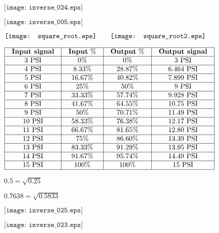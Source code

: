 \documentclass[12pt,a4paper,margin=2cm]{book}
\def\lthtmlcheckvsize{\ifdim\ht\sizebox<\vsize 
  \ifdim\wd\sizebox<\hsize\expandafter\hfill\fi \expandafter\vfill
  \else\expandafter\vss\fi}%
\begin{document}
{\newpage\clearpage
{}%
$\displaystyle \texttt{[image: inverse\_024.eps]}$%
\lthtmlindisplaymathZ
\lthtmlcheckvsize\clearpage}

{\newpage\clearpage
{}%
$\displaystyle \texttt{[image: inverse\_005.eps]}$%
\lthtmlindisplaymathZ
\lthtmlcheckvsize\clearpage}

{\newpage\clearpage
{}%
$\displaystyle \texttt{[image: square\_root.eps]} \hskip 20pt \texttt{[image: square\_root2.eps]}$%
\lthtmlindisplaymathZ
\lthtmlcheckvsize\clearpage}

{\newpage\clearpage
{}%
$\displaystyle \vbox{\offinterlineskip
\halign{\strut
\vrule \quad\hfil # \  \hfil & 
\vrule \quad\hfil # \  \hfil & 
\vrule \quad\hfil # \  \hfil & 
\vrule \quad\hfil # \  \hfil \vrule \cr
\noalign{\hrule }
\textbf{Input signal} & \textbf{Input} \% & \textbf{Output} \% & \textbf{Output signal} \cr
\noalign{\hrule }
3 PSI & 0\% & 0\% & 3 PSI \cr
\noalign{\hrule }
4 PSI & 8.33\% & 28.87\% & 6.464 PSI \cr
\noalign{\hrule }
5 PSI & 16.67\% & 40.82\% & 7.899 PSI \cr
\noalign{\hrule }
6 PSI & 25\% & 50\% & 9 PSI \cr
\noalign{\hrule }
7 PSI & 33.33\% & 57.74\% & 9.928 PSI \cr
\noalign{\hrule }
8 PSI & 41.67\% & 64.55\% & 10.75 PSI \cr
\noalign{\hrule }
9 PSI & 50\% & 70.71\% & 11.49 PSI \cr
\noalign{\hrule }
10 PSI & 58.33\% & 76.38\% & 12.17 PSI \cr
\noalign{\hrule }
11 PSI & 66.67\% & 81.65\% & 12.80 PSI \cr
\noalign{\hrule }
12 PSI & 75\% & 86.60\% & 13.39 PSI \cr
\noalign{\hrule }
13 PSI & 83.33\% & 91.29\% & 13.95 PSI \cr
\noalign{\hrule }
14 PSI & 91.67\% & 95.74\% & 14.49 PSI \cr
\noalign{\hrule }
15 PSI & 100\% & 100\% & 15 PSI \cr
\noalign{\hrule }
} %
}$%
\lthtmlindisplaymathZ
\lthtmlcheckvsize\clearpage}

{\newpage\clearpage
{}%
$ 0.5 = \sqrt{0.25}$%
\lthtmlindisplaymathZ
\lthtmlcheckvsize\clearpage}

{\newpage\clearpage
{}%
$ 0.7638 = \sqrt{0.5833}$%
\lthtmlindisplaymathZ
\lthtmlcheckvsize\clearpage}

{\newpage\clearpage
{}%
$\displaystyle \texttt{[image: inverse\_025.eps]}$%
\lthtmlindisplaymathZ
\lthtmlcheckvsize\clearpage}

{\newpage\clearpage
{}%
$\displaystyle \texttt{[image: inverse\_023.eps]}$%
\lthtmlindisplaymathZ
\lthtmlcheckvsize\clearpage}
\end{document}
